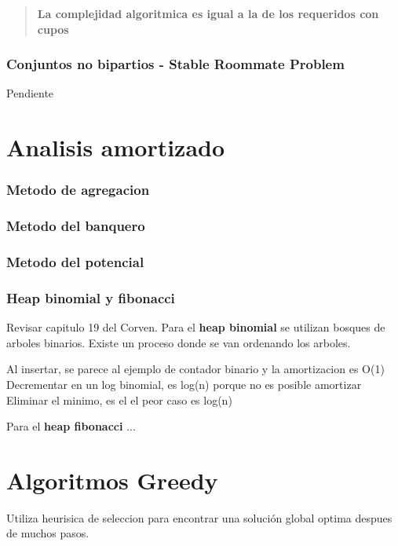 \documentclass{article}
\begin{document}
\begin{quote}
    \textbf{La complejidad algoritmica es igual a la de los requeridos con cupos}
\end{quote}

\newpage
\subsubsection{Conjuntos no bipartios - Stable Roommate Problem}
Pendiente

\newpage
\section{Analisis amortizado}

\subsubsection{Metodo de agregacion}
\subsubsection{Metodo del banquero}
\subsubsection{Metodo del potencial}

\newpage
\subsubsection{Heap binomial y fibonacci}
Revisar capitulo 19 del Corven.
\newline
Para el \textbf{heap binomial} se utilizan bosques de arboles binarios. Existe un proceso donde se van ordenando los arboles.

Al insertar, se parece al ejemplo de contador binario y la amortizacion es O(1)
\newline
Decrementar en un log binomial, es log(n) porque no es posible amortizar
\newline 
Eliminar el minimo, es el el peor caso es log(n)

Para el \textbf{heap fibonacci} ...

\section{Algoritmos Greedy}

Utiliza heurisica de seleccion para encontrar una solución global optima despues de muchos pasos.
\end{document}

